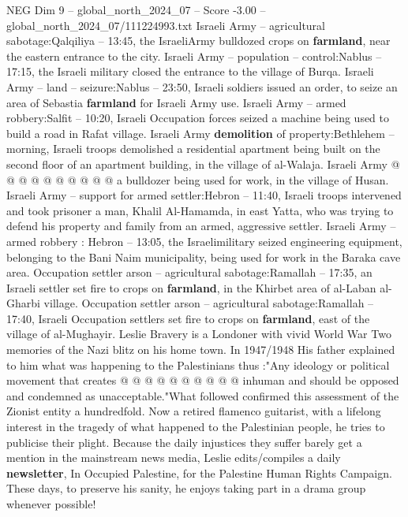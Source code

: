 \begin{textsample}{NEG Dim 9 – global\_north\_2024\_07 – Score -3.00 – global\_north\_2024\_07/111224993.txt}
Israeli Army -- agricultural sabotage:Qalqiliya -- 13:45, the IsraeliArmy bulldozed crops on \textbf{farmland}, near the eastern entrance to the city.
Israeli Army -- population -- control:Nablus -- 17:15, the Israeli military closed the entrance to the village of Burqa.
Israeli Army -- land -- seizure:Nablus -- 23:50, Israeli soldiers issued an order, to seize an area of Sebastia \textbf{farmland} for Israeli Army use.
Israeli Army -- armed robbery:Salfit -- 10:20, Israeli Occupation forces seized a machine being used to build a road in Rafat village.
Israeli Army \textbf{demolition} of property:Bethlehem -- morning, Israeli troops demolished a residential apartment being built on the second floor of an apartment building, in the village of al-Walaja.
Israeli Army @ @ @ @ @ @ @ @ @ @ a bulldozer being used for work, in the village of Husan.
Israeli Army -- support for armed settler:Hebron -- 11:40, Israeli troops intervened and took prisoner a man, Khalil Al-Hamamda, in east Yatta, who was trying to defend his property and family from an armed, aggressive settler.
Israeli Army -- armed robbery : Hebron -- 13:05, the Israelimilitary seized engineering equipment, belonging to the Bani Naim municipality, being used for work in the Baraka cave area.
Occupation settler arson -- agricultural sabotage:Ramallah -- 17:35, an Israeli settler set fire to crops on \textbf{farmland}, in the Khirbet area of al-Laban al-Gharbi village.
Occupation settler arson -- agricultural sabotage:Ramallah -- 17:40, Israeli Occupation settlers set fire to crops on \textbf{farmland}, east of the village of al-Mughayir.
Leslie Bravery is a Londoner with vivid World War Two memories of the Nazi blitz on his home town.
In 1947/1948 His father explained to him what was happening to the Palestinians thus :"Any ideology or political movement that creates @ @ @ @ @ @ @ @ @ @ inhuman and should be opposed and condemned as unacceptable."What followed confirmed this assessment of the Zionist entity a hundredfold.
Now a retired flamenco guitarist, with a lifelong interest in the tragedy of what happened to the Palestinian people, he tries to publicise their plight.
Because the daily injustices they suffer barely get a mention in the mainstream news media, Leslie edits/compiles a daily \textbf{newsletter}, In Occupied Palestine, for the Palestine Human Rights Campaign.
These days, to preserve his sanity, he enjoys taking part in a drama group whenever possible!

\end{textsample}
